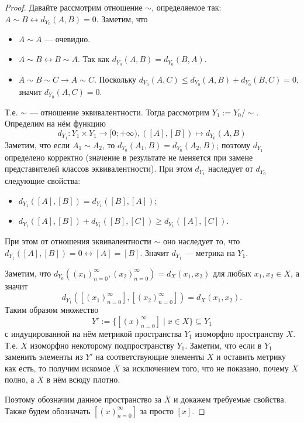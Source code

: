 \documentclass[12pt,a4paper]{article}
\begin{document}
\begin{proof}
        Давайте рассмотрим отношение $\sim$, определяемое так: $A \sim B \leftrightarrow d_{Y_0}(A, B) = 0$. Заметим, что
        \begin{itemize}
            \item $A \sim A$ --- очевидно.
            \item $A \sim B \leftrightarrow B \sim A$. Так как $d_{Y_0}(A, B) = d_{Y_0}(B, A)$.
            \item $A \sim B \sim C \rightarrow A \sim C$. Поскольку $d_{Y_0}(A, C) \leqslant d_{Y_0}(A, B) + d_{Y_0}(B, C) = 0$, значит $d_{Y_0}(A, C) = 0$.
        \end{itemize}
        Т.е. $\sim$ --- отношение эквивалентности. Тогда рассмотрим $Y_1 := Y_0/{\sim}$. Определим на нём функцию
        \[d_{Y_1}: Y_1 \times Y_1 \to [0; + \infty), ([A], [B]) \mapsto d_{Y_0}(A, B)\]
        Заметим, что если $A_1 \sim A_2$, то $d_{Y_0}(A_1, B) = d_{Y_0}(A_2, B)$; поэтому $d_{Y_1}$ определено корректно (значение в результате не меняется при замене представителей классов эквивалентности). При этом $d_{Y_1}$ наследует от $d_{Y_0}$ следующие свойства:
        \begin{itemize}
            \item $d_{Y_1}([A], [B]) = d_{Y_1}([B], [A])$;
            \item $d_{Y_1}([A], [B]) + d_{Y_1}([B], [C]) \geqslant d_{Y_1}([A], [C])$.
        \end{itemize}
        При этом от отношения эквивалентности $\sim$ оно наследует то, что $d_{Y_1}([A], [B]) = 0 \leftrightarrow [A] = [B]$. Значит $d_{Y_1}$ --- метрика на $Y_1$.

        Заметим, что $d_{Y_0}((x_1)_{n=0}^\infty, (x_2)_{n=0}^\infty) = d_X(x_1, x_2)$ для любых $x_1, x_2 \in X$, а значит
        \[d_{Y_1}([(x_1)_{n=0}^\infty], [(x_2)_{n=0}^\infty]) = d_X(x_1, x_2).\]
        Таким образом множество
        \[Y' := \{[(x)_{n=0}^\infty] \mid x \in X\} \subseteq Y_1\]
        с индуцированной на нём метрикой пространства $Y_1$ изоморфно пространству $X$. Т.е. $X$ изоморфно некоторому подпространству $Y_1$. Заметим, что если в $Y_1$ заменить элементы из $Y'$ на соответствующие элементы $X$ и оставить метрику как есть, то получим искомое $\overline{X}$ за исключением того, что не показано, почему $\overline{X}$ полно, а $X$ в нём всюду плотно.
        
        Поэтому обозначим данное пространство за $\overline{X}$ и докажем требуемые свойства. Также будем обозначать $[(x)_{n=0}^\infty]$ за просто $[x]$.


\end{proof}
\end{document}
